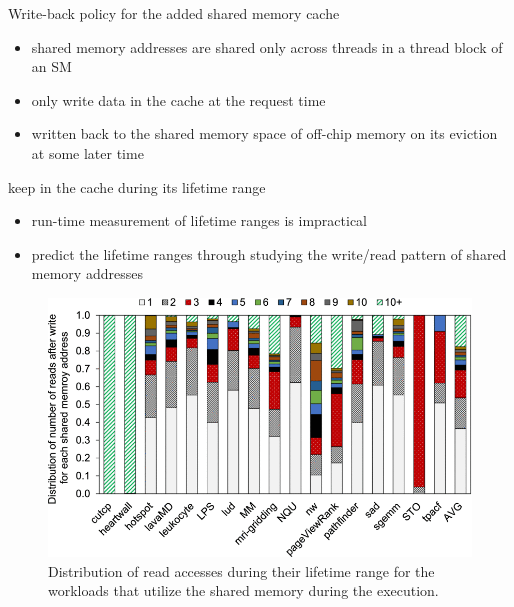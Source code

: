 \documentclass[
    fontset=fandol,
    xcolor=svgnames %
]{ctexbeamer}
\begin{document}
\begin{frame}

    \begin{block}{Write-back
            policy for the added shared memory cache}
        \begin{itemize}
            \item shared memory addresses are shared only across threads in a thread block of an SM
            \item only write data in the cache at the request time
            \item written back to the shared memory space of off-chip memory on its eviction at some later time
        \end{itemize}
    \end{block}

    \begin{block}{keep in the cache during its lifetime range}
        \begin{itemize}
            \item run-time measurement of lifetime ranges is impractical
            \item predict the lifetime ranges through studying the write/read pattern of shared memory addresses
        \end{itemize}
    \end{block}
\end{frame}

\begin{frame}

    \begin{figure}
        \includegraphics[width=1\textwidth]{assets/figure/sadro6-3154315-large.png}
        \caption{Distribution of read accesses during their lifetime range for the workloads that utilize the shared memory during the execution.}
    \end{figure}

\end{frame}
\end{document}
